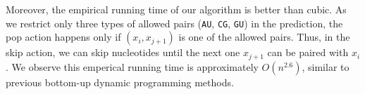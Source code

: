 
Moreover, the empirical running time of our algorithm is better than cubic.
As we restrict only three types of allowed pairs ({\tt AU}, {\tt CG},
{\tt GU}) in the prediction, the pop action happens only if $(x_i, x_{j+1})$ is
one of the allowed pairs. Thus, in the skip action, we can skip nucleotides
until the next one $x_{j+1}$ can be paired with $x_i$.
We observe this emperical running time is approximately $O(n^{2.6})$, similar to
previous bottom-up dynamic programming methods.\cite{do+:2006,
  lorenz+:2011, mathews+turner:2006}



